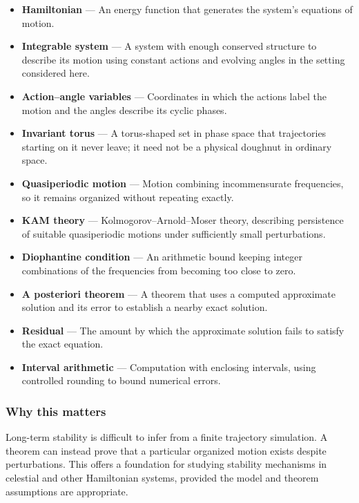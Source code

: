 \documentclass[
  11pt,
]{article}
\begin{document}
\begin{itemize}
\item
  \textbf{Hamiltonian} --- An energy function that generates the
  system's equations of motion.
\item
  \textbf{Integrable system} --- A system with enough conserved
  structure to describe its motion using constant actions and evolving
  angles in the setting considered here.
\item
  \textbf{Action--angle variables} --- Coordinates in which the actions
  label the motion and the angles describe its cyclic phases.
\item
  \textbf{Invariant torus} --- A torus-shaped set in phase space that
  trajectories starting on it never leave; it need not be a physical
  doughnut in ordinary space.
\item
  \textbf{Quasiperiodic motion} --- Motion combining incommensurate
  frequencies, so it remains organized without repeating exactly.
\item
  \textbf{KAM theory} --- Kolmogorov--Arnold--Moser theory, describing
  persistence of suitable quasiperiodic motions under sufficiently small
  perturbations.
\item
  \textbf{Diophantine condition} --- An arithmetic bound keeping integer
  combinations of the frequencies from becoming too close to zero.
\item
  \textbf{A posteriori theorem} --- A theorem that uses a computed
  approximate solution and its error to establish a nearby exact
  solution.
\item
  \textbf{Residual} --- The amount by which the approximate solution
  fails to satisfy the exact equation.
\item
  \textbf{Interval arithmetic} --- Computation with enclosing intervals,
  using controlled rounding to bound numerical errors.
\end{itemize}

\subsubsection{Why this matters}

Long-term stability is difficult to infer from a finite trajectory
simulation. A theorem can instead prove that a particular organized
motion exists despite perturbations. This offers a foundation for
studying stability mechanisms in celestial and other Hamiltonian
systems, provided the model and theorem assumptions are appropriate.
\end{document}

